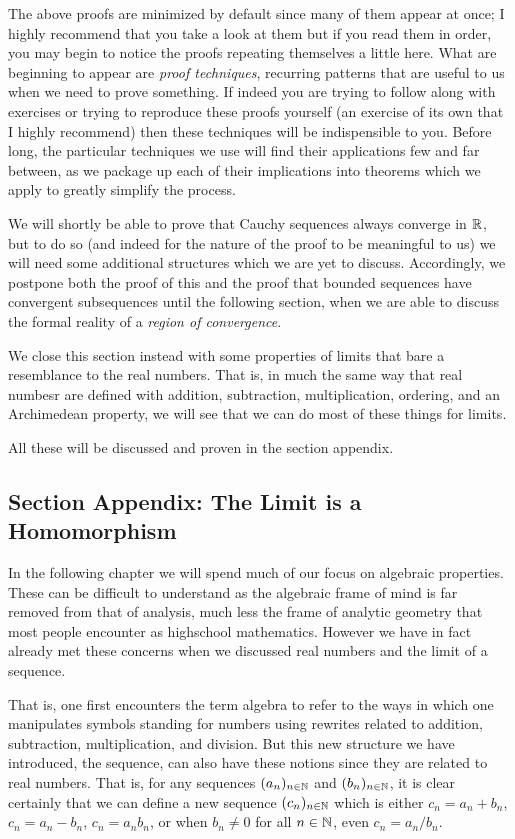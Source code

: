 \documentclass[11pt]{article}
\begin{document}
The above proofs are minimized by default since many of them appear at once; I highly recommend that you take a look at them but if you read them in order, you may begin to notice the proofs repeating themselves a little here. What are beginning to appear are \emph{proof techniques}, recurring patterns that are useful to us when we need to prove something. If indeed you are trying to follow along with exercises or trying to reproduce these proofs yourself (an exercise of its own that I highly recommend) then these techniques will be indispensible to you. Before long, the particular techniques we use will find their applications few and far between, as we package up each of their implications into theorems which we apply to greatly simplify the process.

We will shortly be able to prove that Cauchy sequences always converge in $\mathbb{R}$, but to do so (and indeed for the nature of the proof to be meaningful to us) we will need some additional structures which we are yet to discuss. Accordingly, we postpone both the proof of this and the proof that bounded sequences have convergent subsequences until the following section, when we are able to discuss the formal reality of a \emph{region of convergence}.

We close this section instead with some properties of limits that bare a resemblance to the real numbers. That is, in much the same way that real numbesr are defined with addition, subtraction, multiplication, ordering, and an Archimedean property, we will see that we can do most of these things for limits.

All these will be discussed and proven in the section appendix.

\subsection{Section Appendix: The Limit is a Homomorphism}

In the following chapter we will spend much of our focus on algebraic properties. These can be difficult to understand as the algebraic frame of mind is far removed from that of analysis, much less the frame of analytic geometry that most people encounter as highschool mathematics. However we have in fact already met these concerns when we discussed real numbers and the limit of a sequence.

That is, one first encounters the term algebra to refer to the ways in which one manipulates symbols standing for numbers using rewrites related to addition, subtraction, multiplication, and division. But this new structure we have introduced, the sequence, can also have these notions since they are related to real numbers. That is, for any sequences $(a_n)_{n\in \mathbb{N}}$ and $(b_n)_{n\in \mathbb{N}}$, it is clear certainly that we can define a new sequence $(c_n)_{n\in \mathbb{N}}$ which is either $c_n = a_n + b_n$, $c_n = a_n - b_n$, $c_n = a_n b_n$, or when $b_n \neq 0$ for all $n \in \mathbb{N}$, even $c_n = a_n / b_n$.
\end{document}
